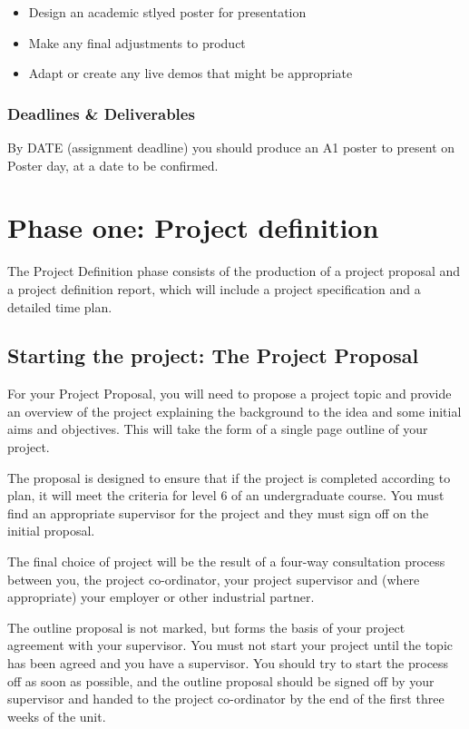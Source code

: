 \begin{itemize}
    \item Design an academic stlyed poster for presentation
    \item Make any final adjustments to product
    \item Adapt or create any live demos that might be appropriate
\end{itemize}

\subsubsection{Deadlines \& Deliverables}

By DATE (assignment deadline) you should produce an A1 poster to present on Poster day, at a date to be confirmed. 
\label{TODO: Date}


\section{Phase one: Project definition}

The Project Definition phase consists of the production of a project proposal and a project definition report, which will include a project specification and a detailed time plan.

\subsection{Starting the project: The Project Proposal}

For your Project Proposal, you will need to propose a project topic and provide an
overview of the project explaining the background to the idea and some initial aims and objectives. This will take the form of a single page outline of your project.

The proposal is designed to ensure that if the project is completed according to plan, it will meet the criteria for level 6 of an undergraduate course. You must find an appropriate supervisor for the project and they must sign off on the initial proposal.

The final choice of project will be the result of a four-way consultation process between you, the project co-ordinator, your project supervisor and (where  appropriate) your employer or other industrial partner.

The outline proposal is not marked, but forms the basis of your project agreement with your supervisor. You must not start your project until the topic has been agreed and you have a supervisor.
You should try to start the process off as soon as possible, and the outline proposal should be signed off by your supervisor and handed to the project co-ordinator by the end of the first three weeks of the unit.

